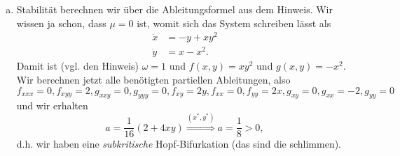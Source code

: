 \documentclass[11pt,a4paper]{article}
\begin{document}
\begin{loes}
\begin{enumerate}[a)]
\item Stabilit\"at berechnen wir \"uber die Ableitungsformel aus dem Hinweis. Wir wissen ja schon, dass $\mu = 0$ ist, womit sich das System schreiben l\"asst als \begin{align*} \dot{x} &= -y  + xy^2\\
  \dot{y} &= x - x^2.\end{align*} Damit ist (vgl. den Hinweis) $\omega = 1$ und $f(x,y) = xy^2$ und $g(x,y) = -x^2.$ Wir berechnen jetzt alle ben\"otigten partiellen Ableitungen, also $f_{xxx} = 0, f_{xyy} = 2, g_{xxy} = 0, g_{yyy} = 0, f_{xy} = 2y, f_{xx} = 0, f_{yy} = 2x, g_{xy} = 0, g_{xx} = -2, g_{yy} = 0$ und wir erhalten \begin{equation*} a = \frac{1}{16}(2 + 4xy) \stackrel{(x^*,y^*)}{\Rightarrow} a = \frac{1}{8} > 0, \end{equation*} d.h. wir haben eine \emph{subkritische} Hopf-Bifurkation (das sind die schlimmen).
\end{enumerate}
\end{loes}
\end{document}
